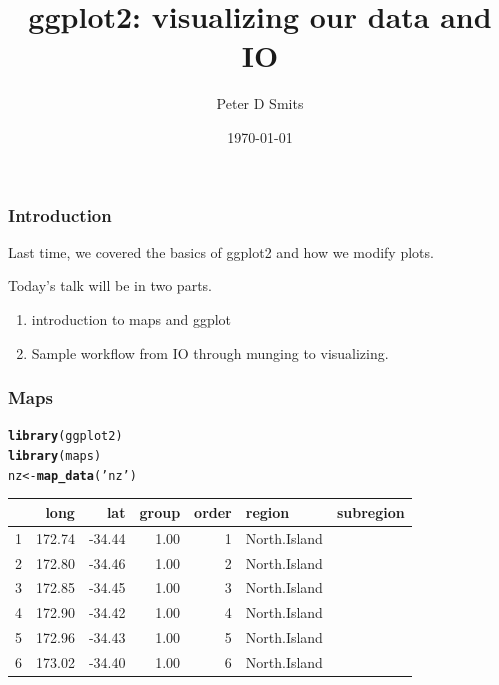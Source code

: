 \documentclass{beamer}\usepackage{graphicx, color}
\title{ggplot2: visualizing our data and IO}
\author{Peter D Smits}
\institute{Committee on Evolutionary Biology \\
University of Chicago}
\date{\today}
\makeatletter
\newcommand{\hlfunctioncall}[1]{\textcolor[rgb]{0.501960784313725,0,0.329411764705882}{\textbf{#1}}}%
\newcommand{\hlstring}[1]{\textcolor[rgb]{0.6,0.6,1}{#1}}%
\newenvironment{kframe}{%
 \def\at@end@of@kframe{}%
 \ifinner\ifhmode%
  \def\at@end@of@kframe{\end{minipage}}%
  \begin{minipage}{\columnwidth}%
 \fi\fi%
 \def\FrameCommand##1{\hskip\@totalleftmargin \hskip-\fboxsep
 \colorbox{shadecolor}{##1}\hskip-\fboxsep
     \hskip-\linewidth \hskip-\@totalleftmargin \hskip\columnwidth}%
 \MakeFramed {\advance\hsize-\width
   \@totalleftmargin\z@ \linewidth\hsize
   \@setminipage}}%
 {\par\unskip\endMakeFramed%
 \at@end@of@kframe}
\newenvironment{knitrout}{}{} %
\makeatother
\begin{document}
\begin{frame}
  \maketitle
\end{frame}

\begin{frame}
  \frametitle{Introduction}

  Last time, we covered the basics of ggplot2 and how we modify plots.

  Today's talk will be in two parts. 
  \begin{enumerate}
    \item introduction to maps and ggplot
    \item Sample workflow from IO through munging to visualizing.
  \end{enumerate}

\end{frame}

\begin{frame}[fragile]
  \frametitle{Maps}
\begin{knitrout}\scriptsize
{}\color{fgcolor}\begin{kframe}
\begin{alltt}
\hlfunctioncall{library}(ggplot2)
\hlfunctioncall{library}(maps)
nz <- \hlfunctioncall{map_data}(\hlstring{'nz'})
\end{alltt}
\end{kframe}
\end{knitrout}


\begin{table}[ht]
\begin{center}
\begin{tabular}{rrrrrll}
  \hline
 & long & lat & group & order & region & subregion \\ 
  \hline
1 & 172.74 & -34.44 & 1.00 &   1 & North.Island  &  \\ 
  2 & 172.80 & -34.46 & 1.00 &   2 & North.Island  &  \\ 
  3 & 172.85 & -34.45 & 1.00 &   3 & North.Island  &  \\ 
  4 & 172.90 & -34.42 & 1.00 &   4 & North.Island  &  \\ 
  5 & 172.96 & -34.43 & 1.00 &   5 & North.Island  &  \\ 
  6 & 173.02 & -34.40 & 1.00 &   6 & North.Island  &  \\ 
   \hline
\end{tabular}
\end{center}
\end{table}



\end{frame}
\end{document}

